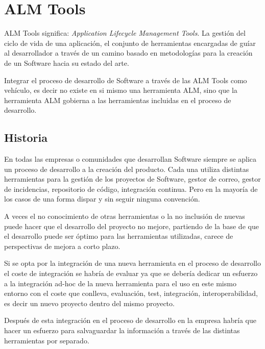 \section{ALM Tools}
\label{sec:almtools}

\par ALM Tools significa: \emph{Application Lifecycle Management Tools}. La gesti\'on del ciclo de vida de una aplicaci\'on, el conjunto de herramientas encargadas de gu\'iar al desarrollador a trav\'es de un camino basado en metodolog\'ias para la creaci\'on de un Software hacia su estado del arte.

\par Integrar el proceso de desarrollo de Software a trav\'es de las ALM Tools como veh\'iculo, es decir no existe en si mismo una herramienta ALM, sino que la herramienta ALM gobierna a las herramientas incluidas en el proceso de desarrollo.

\subsection{Historia}
\label{sub:historia}

\par En todas las empresas o comunidades que desarrollan Software siempre se aplica un proceso de desarrollo a la creación del producto. Cada una utiliza distintas herramientas para la gesti\'on de los proyectos de Software, gestor de correo, gestor de incidencias, repositorio de c\'odigo, integraci\'on continua. Pero en la mayor\'ia de los casos de una forma dispar y sin seguir ninguna convención.

\par A veces el no conocimiento de otras herramientas o la no inclusión de nuevas puede hacer que el desarrollo del proyecto no mejore, partiendo de la base de que el desarrollo puede ser óptimo para las herramientas utilizadas, carece de perspectivas de mejora a corto plazo.

\par Si se opta por la integración de una nueva herramienta en el proceso de desarrollo el coste de integración se habría de evaluar ya que se debería dedicar un esfuerzo a la integración ad-hoc de la nueva herramienta para el uso en este mismo entorno con el coste que conlleva, evaluación, test, integración, interoperabilidad, es decir un nuevo proyecto dentro del mismo proyecto.

\par Después de esta integración en el proceso de desarrollo en la empresa habría que hacer un esfuerzo para salvaguardar la información a través de las distintas herramientas por separado.

